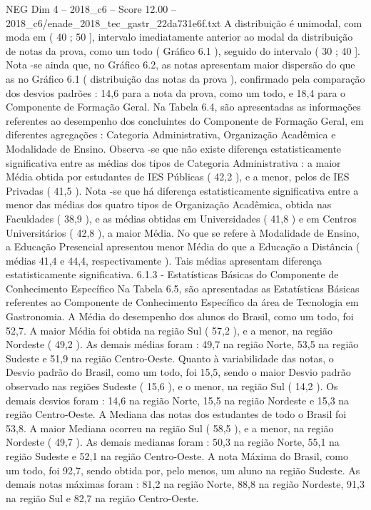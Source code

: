 \begin{textsample}{NEG Dim 4 – 2018\_c6 – Score 12.00 – 2018\_c6/enade\_2018\_tec\_gastr\_22da731e6f.txt}
A distribuição é unimodal, com moda em ( 40 ; 50 ], intervalo imediatamente anterior ao modal da distribuição de notas da prova, como um todo ( Gráfico 6.1 ), seguido do intervalo ( 30 ; 40 ].
Nota -se ainda que, no Gráfico 6.2, as notas apresentam maior dispersão do que as no Gráfico 6.1 ( distribuição das notas da prova ), confirmado pela comparação dos desvios padrões : 14,6 para a nota da prova, como um todo, e 18,4 para o Componente de Formação Geral.
Na Tabela 6.4, são apresentadas as informações referentes ao desempenho dos concluintes do Componente de Formação Geral, em diferentes agregações : Categoria Administrativa, Organização Acadêmica e Modalidade de Ensino.
Observa -se que não existe diferença estatisticamente significativa entre as médias dos tipos de Categoria Administrativa : a maior Média obtida por estudantes de IES Públicas ( 42,2 ), e a menor, pelos de IES Privadas ( 41,5 ).
Nota -se que há diferença estatisticamente significativa entre a menor das médias dos quatro tipos de Organização Acadêmica, obtida nas Faculdades ( 38,9 ), e as médias obtidas em Universidades ( 41,8 ) e em Centros Universitários ( 42,8 ), a maior Média.
No que se refere à Modalidade de Ensino, a Educação Presencial apresentou menor Média do que a Educação a Distância ( médias 41,4 e 44,4, respectivamente ).
Tais médias apresentam diferença estatisticamente significativa. 6.1.3 - Estatísticas Básicas do Componente de Conhecimento Específico Na Tabela 6.5, são apresentadas as Estatísticas Básicas referentes ao Componente de Conhecimento Específico da área de Tecnologia em Gastronomia.
A Média do desempenho dos alunos do Brasil, como um todo, foi 52,7.
A maior Média foi obtida na região Sul ( 57,2 ), e a menor, na região Nordeste ( 49,2 ).
As demais médias foram : 49,7 na região Norte, 53,5 na região Sudeste e 51,9 na região Centro-Oeste.
Quanto à variabilidade das notas, o Desvio padrão do Brasil, como um todo, foi 15,5, sendo o maior Desvio padrão observado nas regiões Sudeste ( 15,6 ), e o menor, na região Sul ( 14,2 ).
Os demais desvios foram : 14,6 na região Norte, 15,5 na região Nordeste e 15,3 na região Centro-Oeste.
A Mediana das notas dos estudantes de todo o Brasil foi 53,8.
A maior Mediana ocorreu na região Sul ( 58,5 ), e a menor, na região Nordeste ( 49,7 ).
As demais medianas foram : 50,3 na região Norte, 55,1 na região Sudeste e 52,1 na região Centro-Oeste.
A nota Máxima do Brasil, como um todo, foi 92,7, sendo obtida por, pelo menos, um aluno na região Sudeste.
As demais notas máximas foram : 81,2 na região Norte, 88,8 na região Nordeste, 91,3 na região Sul e 82,7 na região Centro-Oeste.

\end{textsample}
